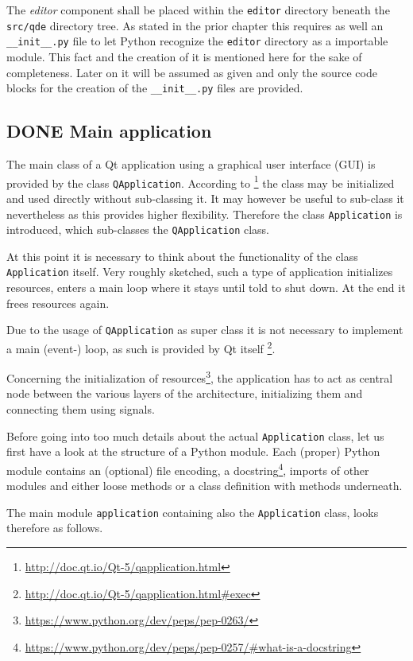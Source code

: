 \documentclass[10pt, openright, notitlepage]{scrreprt}
\begin{document}
The \emph{editor} component shall be placed within the \texttt{editor} directory beneath the
\texttt{src/qde} directory tree. As stated in the prior chapter this requires as well
an \texttt{\_\_init\_\_.py} file to let Python recognize the \texttt{editor} directory as a
importable module. This fact and the creation of it is mentioned here for the
sake of completeness. Later on it will be assumed as given and only the source
code blocks for the creation of the \texttt{\_\_init\_\_.py} files are provided.
\subsection{{\bfseries\sffamily DONE} Main application}
\label{sec:org0a41b22}
The main class of a Qt application using a graphical user interface (GUI)
is provided by the class \texttt{QApplication}. According to
\footnote{\url{http://doc.qt.io/Qt-5/qapplication.html}} the class may be initialized and
used directly without sub-classing it. It may however be useful to sub-class it
nevertheless as this provides higher flexibility. Therefore the class
\texttt{Application} is introduced, which sub-classes the \texttt{QApplication} class.

At this point it is necessary to think about the functionality of the class
\texttt{Application} itself. Very roughly sketched, such a type of application
initializes resources, enters a main loop where it stays until told to shut
down. At the end it frees resources again.

Due to the usage of \texttt{QApplication} as super class it is not necessary to
implement a main (event-) loop, as such is provided by Qt itself
\footnote{\url{http://doc.qt.io/Qt-5/qapplication.html\#exec}}.

Concerning the initialization of
resources\footnote{\url{https://www.python.org/dev/peps/pep-0263/}}, the application has
to act as central node between the various layers of the architecture,
initializing them and connecting them using signals.\cite[S. 37 bis 38]{osterwalder_qde_2016}

Before going into too much details about the actual \texttt{Application} class, let us
first have a look at the structure of a Python module. Each (proper) Python
module contains an (optional) file encoding, a
docstring\footnote{\url{https://www.python.org/dev/peps/pep-0257/\#what-is-a-docstring}},
imports of other modules and either loose methods or a class definition with
methods underneath.

The main module \texttt{application} containing also the \texttt{Application} class, looks
therefore as follows.
\end{document}
